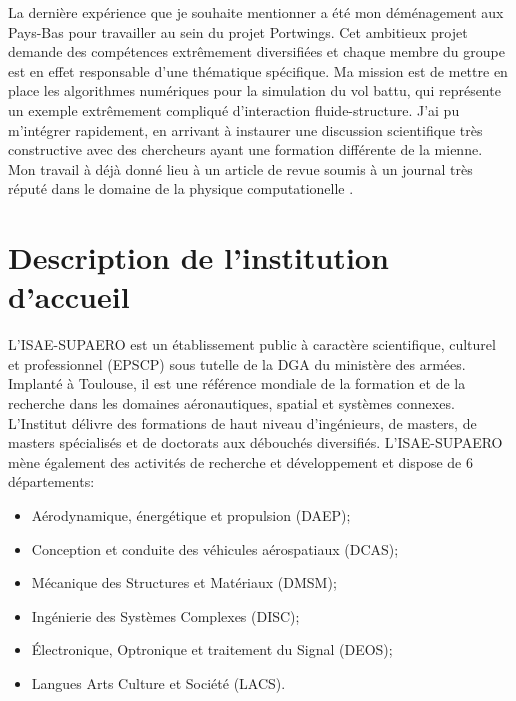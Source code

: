 \documentclass[12pt, french]{article}
\begin{document}
	La dernière expérience que je souhaite mentionner a été mon déménagement aux Pays-Bas pour travailler au sein du projet Portwings. Cet ambitieux projet demande des compétences extrêmement diversifiées et chaque membre du groupe est en effet responsable d'une thématique spécifique. Ma mission est de mettre en place les algorithmes numériques pour la simulation du vol battu, qui représente un exemple extrêmement compliqué d'interaction fluide-structure. J'ai pu m'intégrer rapidement, en arrivant à instaurer une discussion scientifique très constructive avec des chercheurs ayant une formation différente de la mienne. Mon travail à déjà donné lieu à un article de revue soumis à un journal très réputé dans le domaine de la physique computationelle . 
	
	
	
	
	
	\section{Description de l'institution d'accueil}
	
	L'ISAE-SUPAERO est un établissement public à caractère scientifique, culturel et professionnel (EPSCP) sous tutelle de la DGA du ministère des armées. Implanté à Toulouse, il est une référence mondiale de la formation et de la recherche dans les domaines aéronautiques, spatial et systèmes connexes. L'Institut délivre des
	formations de haut niveau d'ingénieurs, de masters, de masters spécialisés et de doctorats aux débouchés diversifiés. L'ISAE-SUPAERO mène également des activités de recherche et développement et dispose de 6 départements:
	\begin{itemize}
		\item Aérodynamique, énergétique et propulsion (DAEP);
		\item Conception et conduite des véhicules aérospatiaux (DCAS);
		\item Mécanique des Structures et Matériaux (DMSM);
		\item Ingénierie des Systèmes Complexes (DISC); 
		\item Électronique, Optronique et traitement du Signal (DEOS);
		\item Langues Arts Culture et Société (LACS).
	\end{itemize}
\end{document}
